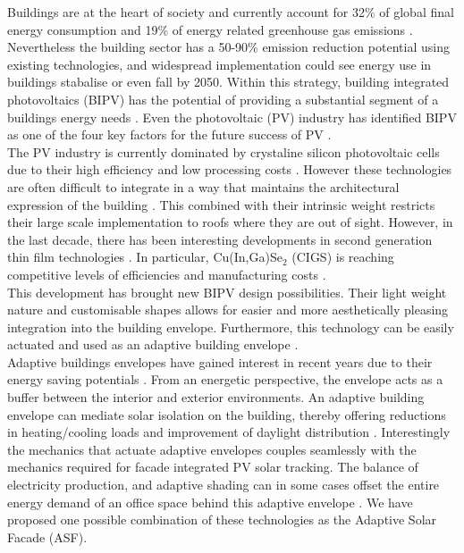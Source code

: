 
Buildings are at the heart of society and currently account for 32\% of global final energy consumption and 19\% of energy related greenhouse gas emissions \cite{IPCC}. Nevertheless the building sector has a 50-90\% emission reduction potential using existing technologies, and widespread implementation could see energy use in buildings stabalise or even fall by 2050. Within this strategy, building integrated photovoltaics (BIPV) has the potential of providing a substantial segment of a buildings energy needs \cite{Shoen1997}. Even the photovoltaic (PV) industry has identified BIPV as one of the four key factors for the future success of PV \cite{raugei2009life}. \\

The PV industry is currently dominated by crystaline silicon photovoltaic cells due to their high efficiency and low processing costs \cite{saga2010advances}. However these technologies are often difficult to integrate in a way that maintains the architectural expression of the building \cite{Lueling2009ee}. This combined with their intrinsic weight restricts their large scale implementation to roofs where they are out of sight. However, in the last decade, there has been interesting developments in second generation thin film technologies \cite{NREL}. In particular, Cu(In,Ga)Se$_2$ (CIGS) is reaching  competitive levels of efficiencies \cite{kushiya2014cis} and manufacturing costs \cite{kaelin2004low} \cite{jelle2012building}.\\

This development has brought new BIPV design possibilities. Their light weight nature and customisable shapes allows for easier and more aesthetically pleasing integration into the building envelope. Furthermore, this technology can be easily actuated and used as an adaptive building envelope \cite{rossi2012adaptive}. \\

Adaptive buildings envelopes have gained interest in recent years due to their energy saving potentials \cite{loonen2013climate}. From an energetic perspective, the envelope acts as a buffer between the interior and exterior environments. An adaptive building envelope can mediate solar isolation on the building, thereby offering reductions in heating/cooling loads and improvement of daylight distribution \cite{rossi2012adaptive}. Interestingly the mechanics that actuate adaptive envelopes couples seamlessly with the mechanics required for facade integrated PV solar tracking. The balance of electricity production, and adaptive shading can in some cases offset the entire energy demand of an office space behind this adaptive envelope \cite{jayathissa2015abs}. We have proposed one possible combination of these technologies as the Adaptive Solar Facade (ASF).\\

